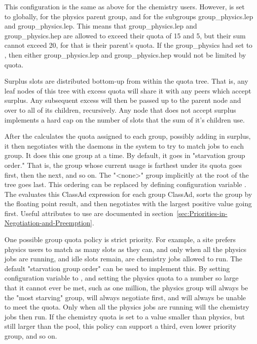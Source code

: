 This configuration is the same as above for the chemistry users.
However,  is set to  globally, 
 for the physics parent group, 
and  for the subgroups group\_physics.lep and group\_physics.lep.
This means that group\_physics.lep and group\_physics.hep
are allowed to exceed their quota of 15 and 5, 
but their sum cannot exceed 20, for that is their parent's quota.
If the group\_physics had  set to ,
then either group\_physics.lep and group\_physics.hep would not 
be limited by quota.  

Surplus slots are distributed bottom-up from within the quota tree.
That is, any leaf nodes of this tree with 
excess quota will share it with any peers which accept surplus. 
Any subsequent excess will then be 
passed up to the parent node and over to all of its children, recursively.
Any node that does not accept surplus implements a hard cap on the 
number of slots that the sum of it's children use.

After the  calculates the quota assigned to each group, 
possibly adding in surplus, 
it then negotiates with the  daemons in the system to 
try to match jobs to each group.
It does this one group at a time.  
By default, it goes in "starvation group order." 
That is, the group whose current usage is farthest under its quota goes first,
then the next, and so on.  
The "<none>" group implicitly at the root of the tree goes last.
This ordering can be replaced by defining configuration variable
.
The  evaluates this ClassAd expression for each group 
ClassAd, 
sorts the group by the floating point result, 
and then negotiates with the largest positive value going first.
Useful attributes to use are documented
in section~\ref{sec:Priorities-in-Negotiation-and-Preemption}.

One possible group quota policy is strict priority.
For example, a site prefers physics users to match as many slots as they can,
and only when all the physics jobs are running, 
and idle slots remain,
are chemistry jobs allowed to run.  
The default "starvation group order" can be used to implement this.  
By setting configuration variable 
 to ,
and setting the physics quota to a number so large that it cannot ever be met,
such as one million, 
the physics group will always be the "most starving" group,
will always negotiate first, 
and will always be unable to meet the quota.  
Only when all the physics jobs are running
will the chemistry jobs then run.  If the chemistry quota is set to a value smaller than physics, but still larger than the
pool, this policy can support a third, even lower priority group, and so on.

